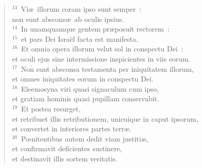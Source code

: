 \begin{flushleft}
\begin{verse}
${}^{13}$~Vi\ae\ illorum coram ipso sunt semper~:\\ non sunt abscons\ae\ ab oculis ipsius.\\
${}^{14}$~In unamquamque gentem pr\ae posuit rectorem~:\\
${}^{15}$~et pars Dei Isra\"el facta est manifesta.\\
${}^{16}$~Et omnia opera illorum velut sol in conspectu Dei~:\\ et oculi ejus sine intermissione inspicientes in viis eorum.\\
${}^{17}$~Non sunt absconsa testamenta per iniquitatem illorum,\\ et omnes iniquitates eorum in conspectu Dei.\\
${}^{18}$~Eleemosyna viri quasi signaculum cum ipso,\\ et gratiam hominis quasi pupillam conservabit.\\
${}^{19}$~Et postea resurget,\\ et retribuet illis retributionem, unicuique in caput ipsorum,\\ et convertet in interiores partes terr\ae .\\
${}^{20}$~Pœnitentibus autem dedit viam justiti\ae ,\\ et confirmavit deficientes sustinere,\\ et destinavit illis sortem veritatis.\end{verse}\end{flushleft}


